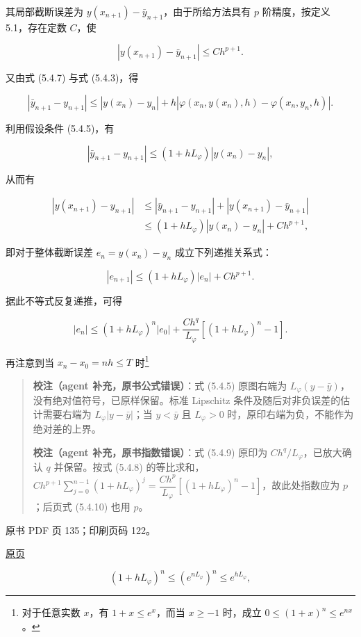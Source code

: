 其局部截断误差为 \(y(x_{n+1})-\bar y_{n+1}\)，由于所给方法具有 \(p\) 阶精度，按定义 5.1，存在定数 \(C\)，使

\[
|y(x_{n+1})-\bar y_{n+1}|\leqslant Ch^{p+1}.
\]

又由式 (5.4.7) 与式 (5.4.3)，得

\[
|\bar y_{n+1}-y_{n+1}|\leqslant|y(x_n)-y_n|+h|\varphi(x_n,y(x_n),h)-\varphi(x_n,y_n,h)|.
\]

利用假设条件 (5.4.5)，有

\[
|\bar y_{n+1}-y_{n+1}|\leqslant(1+hL_\varphi)|y(x_n)-y_n|,
\]

从而有

\[
\begin{aligned}
|y(x_{n+1})-y_{n+1}|&\leqslant|\bar y_{n+1}-y_{n+1}|+|y(x_{n+1})-\bar y_{n+1}|\\
&\leqslant(1+hL_\varphi)|y(x_n)-y_n|+Ch^{p+1},
\end{aligned}
\]

即对于整体截断误差 \(e_n=y(x_n)-y_n\) 成立下列递推关系式：

\[
|e_{n+1}|\leqslant(1+hL_\varphi)|e_n|+Ch^{p+1}.\tag{5.4.8}
\]

据此不等式反复递推，可得

\[
|e_n|\leqslant(1+hL_\varphi)^n|e_0|+\frac{Ch^q}{L_\varphi}[(1+hL_\varphi)^n-1].\tag{5.4.9}
\]

再注意到当 \(x_n-x_0=nh\leqslant T\) 时\footnote{对于任意实数 \(x\)，有 \(1+x\leqslant e^x\)，而当 \(x\geqslant-1\) 时，成立 \(0\leqslant(1+x)^n\leqslant e^{nx}\)。}

\begin{quote}
\textbf{校注（agent 补充，原书公式错误）}：式 (5.4.5) 原图右端为 \(L_\varphi(y-\bar y)\)，没有绝对值符号，已原样保留。标准 Lipschitz 条件及随后对非负误差的估计需要右端为 \(L_\varphi|y-\bar y|\)；当 \(y<\bar y\) 且 \(L_\varphi>0\) 时，原印右端为负，不能作为绝对差的上界。

\textbf{校注（agent 补充，原书指数错误）}：式 (5.4.9) 原印为 \(Ch^q/L_\varphi\)，已放大确认 \(q\) 并保留。按式 (5.4.8) 的等比求和，\(Ch^{p+1}\sum_{j=0}^{n-1}(1+hL_\varphi)^j=\dfrac{Ch^p}{L_\varphi}[(1+hL_\varphi)^n-1]\)，故此处指数应为 \(p\)；后页式 (5.4.10) 也用 \(p\)。
\end{quote}

\clearpage

原书 PDF 页 135；印刷页码 122。

\href{source-images/pdf-135.jpeg}{原页}

\[
(1+hL_\varphi)^n\leqslant(e^{nL_\varphi})^n\leqslant e^{hL_\varphi},
\]

